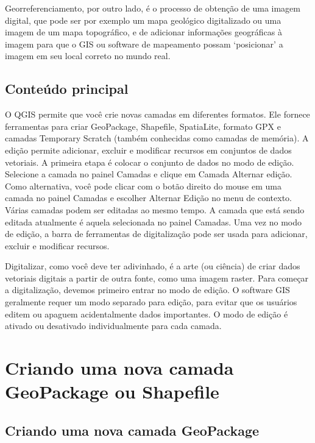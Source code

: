 \documentclass[
  portuguese,
]{krantz}
\begin{document}
Georreferenciamento, por outro lado, é o processo de obtenção de uma imagem digital, que pode ser por exemplo um mapa geológico digitalizado ou uma imagem de um mapa topográfico, e de adicionar informações geográficas à imagem para que o GIS ou software de mapeamento possam `posicionar' a imagem em seu local correto no mundo real.

\hypertarget{conteuxfado-principal}{%
\subsection{Conteúdo principal}\label{conteuxfado-principal}}

O QGIS permite que você crie novas camadas em diferentes formatos. Ele fornece ferramentas para criar GeoPackage, Shapefile, SpatiaLite, formato GPX e camadas Temporary Scratch (também conhecidas como camadas de memória). A edição permite adicionar, excluir e modificar recursos em conjuntos de dados vetoriais. A primeira etapa é colocar o conjunto de dados no modo de edição. Selecione a camada no painel Camadas e clique em Camada \textbar{} Alternar edição. Como alternativa, você pode clicar com o botão direito do mouse em uma camada no painel Camadas e escolher Alternar Edição no menu de contexto. Várias camadas podem ser editadas ao mesmo tempo. A camada que está sendo editada atualmente é aquela selecionada no painel Camadas. Uma vez no modo de edição, a barra de ferramentas de digitalização pode ser usada para adicionar, excluir e modificar recursos.

Digitalizar, como você deve ter adivinhado, é a arte (ou ciência) de criar dados vetoriais digitais a partir de outra fonte, como uma imagem raster. Para começar a digitalização, devemos primeiro entrar no modo de edição. O software GIS geralmente requer um modo separado para edição, para evitar que os usuários editem ou apaguem acidentalmente dados importantes. O modo de edição é ativado ou desativado individualmente para cada camada.

\hypertarget{criando-uma-nova-camada-geopackage-ou-shapefile}{%
\section{Criando uma nova camada GeoPackage ou Shapefile}\label{criando-uma-nova-camada-geopackage-ou-shapefile}}

\hypertarget{criando-uma-nova-camada-geopackage}{%
\subsection{\texorpdfstring{\textbf{Criando uma nova camada GeoPackage}}{Criando uma nova camada GeoPackage}}\label{criando-uma-nova-camada-geopackage}}
\end{document}
